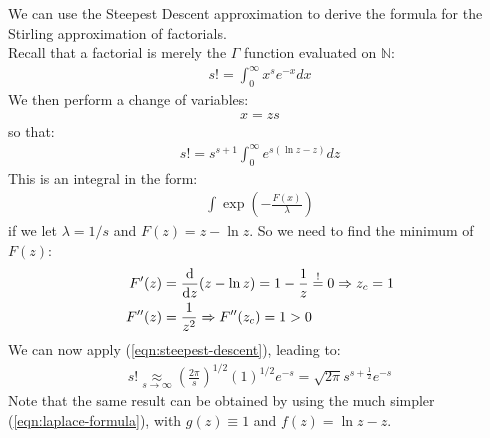 \documentclass[../template.tex]{subfiles}
\begin{document}
\begin{example}
We can use the Steepest Descent approximation to derive the formula for the Stirling approximation of factorials.\\
Recall that a factorial is merely the $\Gamma$ function evaluated on $\mathbb{N}$:  
\begin{align*}
    s! = \int_0^\infty x^s e^{-x} dx
\end{align*} 
We then perform a change of variables:
\begin{align*}
    x = z s
\end{align*}
so that:
\begin{align*}
    s! = s^{s+1} \int_0^\infty e^{s(\ln z - z)} dz
\end{align*}
This is an integral in the form:
\begin{align*}
    \int \exp\left(-\frac{F(x)}{\lambda} \right)
\end{align*}
if we let $\lambda = 1/s$ and $F(z) = z-\ln z$. So we need to find the minimum of $F(z)$:
\begin{align*}
    F'(z) &= \dv{z}(z-\ln z) = 1-\frac{1}{z} \overset{!}{=}  0 \Rightarrow z_c =  1\\
    F''(z) &= \frac{1}{z^2} \Rightarrow F''(z_c) = 1 > 0 
\end{align*}   
We can now apply (\ref{eqn:steepest-descent}), leading to:
\begin{align*}
    s! \underset{s \to \infty}{\approx}  \left(\frac{2 \pi}{s} \right)^{1/2} (1)^{1/2} e^{-s} = \sqrt{2 \pi} s^{s+\frac{1}{2} } e^{-s}
\end{align*}
Note that the same result can be obtained by using the much simpler (\ref{eqn:laplace-formula}), with $g(z) \equiv 1$ and $f(z) = \ln z - z$.
\end{example} 
\clearpage
\end{document}

